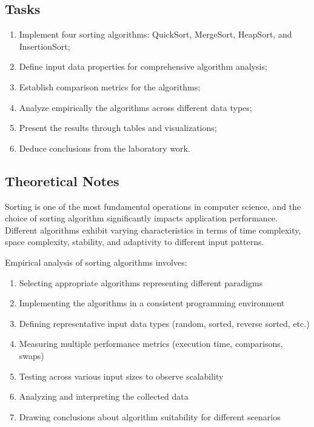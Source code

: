 \documentclass[12pt]{article}
\begin{document}
\subsection{Tasks}
\begin{enumerate}
    \item Implement four sorting algorithms: QuickSort, MergeSort, HeapSort, and InsertionSort;
    \item Define input data properties for comprehensive algorithm analysis;
    \item Establish comparison metrics for the algorithms;
    \item Analyze empirically the algorithms across different data types;
    \item Present the results through tables and visualizations;
    \item Deduce conclusions from the laboratory work.
\end{enumerate}

\subsection{Theoretical Notes}
\hspace{0.8cm} Sorting is one of the most fundamental operations in computer science, and the choice of sorting algorithm significantly impacts application performance. Different algorithms exhibit varying characteristics in terms of time complexity, space complexity, stability, and adaptivity to different input patterns.

Empirical analysis of sorting algorithms involves:

\begin{enumerate}
    \item Selecting appropriate algorithms representing different paradigms
    \item Implementing the algorithms in a consistent programming environment
    \item Defining representative input data types (random, sorted, reverse sorted, etc.)
    \item Measuring multiple performance metrics (execution time, comparisons, swaps)
    \item Testing across various input sizes to observe scalability
    \item Analyzing and interpreting the collected data
    \item Drawing conclusions about algorithm suitability for different scenarios
\end{enumerate}
\end{document}
